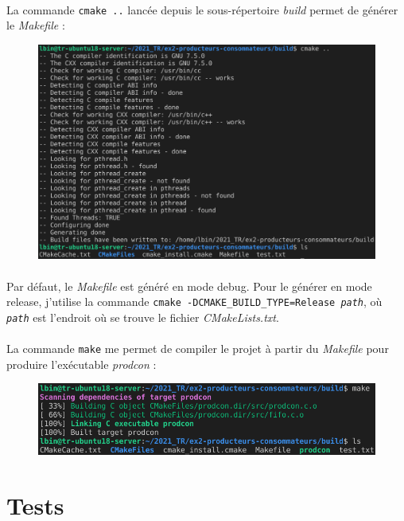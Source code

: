 \documentclass{article}
\begin{document}
    \newpage
    \paragraph{}
    La commande \texttt{cmake ..} lancée depuis le sous-répertoire \emph{build} permet de générer le \emph{Makefile} :
    \begin{figure}[H]
        \centering
        \includegraphics[width=.8\textwidth]{./screenshots/cmake.png}
    \end{figure}

    \paragraph{}
    Par défaut, le \emph{Makefile} est généré en mode debug. Pour le générer en mode release, j'utilise la commande \texttt{cmake -DCMAKE\_BUILD\_TYPE=Release \emph{path}}, où \texttt{\emph{path}} est l'endroit où se trouve le fichier \emph{CMakeLists.txt}.
    
    \paragraph{}
    La commande \texttt{make} me permet de compiler le projet à partir du \emph{Makefile} pour produire l'exécutable \emph{prodcon} :
    \begin{figure}[H]
        \centering
        \includegraphics[width=.65\textwidth]{./screenshots/make.png}
    \end{figure}

    \newpage
    \section{Tests}
\end{document}
